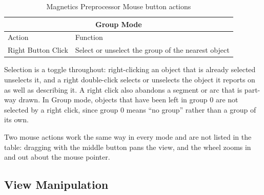 \documentclass[12pt]{report}
\begin{document}
\begin{table}[ht]
\vspace*{12pt}
\begin{tabular}{|l|l|} \hline \hline
\multicolumn{2}{|c|}{Group Mode} \\ \hline \hline
 Action    & Function \\ \hline \hline
 Right Button Click    & Select or unselect the group of the nearest object \\ \hline \hline
\end{tabular}
\caption{Magnetics Preprocessor Mouse button actions}
\label{mouseclicks}
\end{table}

Selection is a toggle throughout: right-clicking an object that is
already selected unselects it, and a right double-click selects or
unselects the object it reports on as well as describing it.  A right
click also abandons a segment or arc that is part-way drawn.  In Group
mode, objects that have been left in group 0 are not selected by a
right click, since group 0 means ``no group'' rather than a group of
its own.

Two mouse actions work the same way in every mode and are not listed
in the table: dragging with the middle button pans the view, and the
wheel zooms in and out about the mouse pointer.

\subsection{View Manipulation} \label{view_manipulation}
\end{document}
